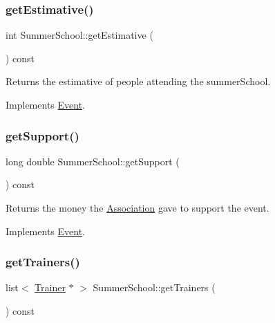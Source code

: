 \subsubsection{\texorpdfstring{get\+Estimative()}{getEstimative()}}
{\footnotesize\ttfamily int Summer\+School\+::get\+Estimative (\begin{DoxyParamCaption}{ }\end{DoxyParamCaption}) const\hspace{0.3cm}{\ttfamily [virtual]}}



Returns the estimative of people attending the summer\+School. 



Implements \hyperlink{classEvent_a18ac55c239f648fc0ad5687c426f2a8f}{Event}.

\mbox{\label{classSummerSchool_a86f34a2f39dcd33171e77c386165219c}} 
\subsubsection{\texorpdfstring{get\+Support()}{getSupport()}}
{\footnotesize\ttfamily long double Summer\+School\+::get\+Support (\begin{DoxyParamCaption}{ }\end{DoxyParamCaption}) const\hspace{0.3cm}{\ttfamily [virtual]}}



Returns the money the \hyperlink{classAssociation}{Association} gave to support the event. 



Implements \hyperlink{classEvent_a9170bfcbd9b00015dafc5d5cc69a2cfe}{Event}.

\mbox{\label{classSummerSchool_aba18410ee9fbafd26858232104b5b39f}} 
\subsubsection{\texorpdfstring{get\+Trainers()}{getTrainers()}}
{\footnotesize\ttfamily list$<$ \hyperlink{classTrainer}{Trainer} $\ast$ $>$ Summer\+School\+::get\+Trainers (\begin{DoxyParamCaption}{ }\end{DoxyParamCaption}) const\hspace{0.3cm}{\ttfamily [virtual]}}



